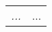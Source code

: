 \newcommand{\defAbbreviation}[2]{
	\textit{#1} & #2 \label{abbrev:#1} \\
}

\begin{tabular}{ll}
	\defAbbreviation{...}{...}
\end{tabular}
